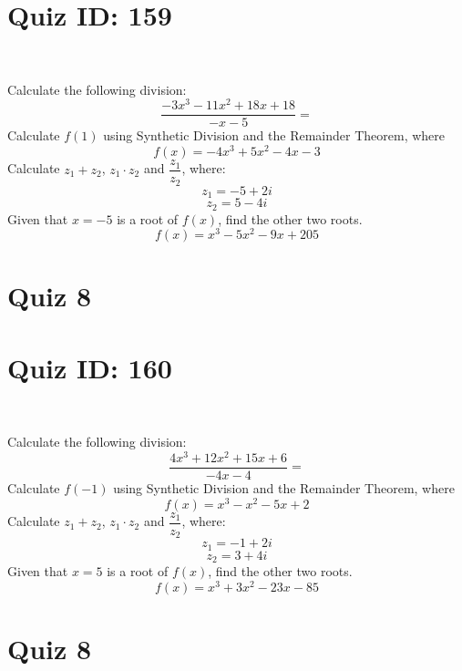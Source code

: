 \documentclass{exam}
\begin{document}
\section*{Quiz ID: 159}
\vspace{0.5cm}\
\vspace{1cm}\
\begin{questions}
\question Calculate the following division:\[\dfrac{
-3x^3 - 11x^2 + 18x + 18}{
-x - 5}=\] \makeemptybox{\stretch{2}}
\question Calculate $f(1)$ using Synthetic Division and the Remainder Theorem, where\[f(x) = 
-4x^3 + 5x^2 - 4x - 3\]
\newpage\question Calculate $z_1+z_2$, $z_1\cdot z_2$ and $\dfrac{z_1}{z_2}$, where:\[z_1=-5+2\mathit{i}\]\[z_2=5-4\mathit{i}\]
\question Given that $x=-5$ is a root of $f(x)$, find the other two roots.\[f(x)=
x^3 - 5x^2 - 9x + 205\]\makeemptybox{\stretch{1}}
\end{questions}\newpage
\newpage
\section*{Quiz 8}
\section*{Quiz ID: 160}
\vspace{0.5cm}\
\vspace{1cm}\
\begin{questions}
\question Calculate the following division:\[\dfrac{
4x^3 + 12x^2 + 15x + 6}{
-4x - 4}=\] 
\question Calculate $f(-1)$ using Synthetic Division and the Remainder Theorem, where\[f(x) = 
x^3 - x^2 - 5x + 2\]
\newpage\question Calculate $z_1+z_2$, $z_1\cdot z_2$ and $\dfrac{z_1}{z_2}$, where:\[z_1=-1+2\mathit{i}\]\[z_2=3+4\mathit{i}\]\makeemptybox{\stretch{1}}
\question Given that $x=5$ is a root of $f(x)$, find the other two roots.\[f(x)=
x^3 + 3x^2 - 23x - 85\]\makeemptybox{\stretch{1}}
\end{questions}\newpage
\newpage
\section*{Quiz 8}
\end{document}
